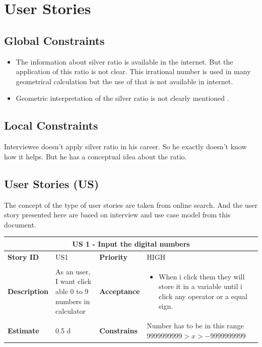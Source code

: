 \documentclass{article}
\begin{document}
\section{User Stories}
\subsection{Global Constraints}
\begin{itemize}
  \item The information about silver ratio is available in the internet. But the application of this ratio is not clear. This irrational number is used in many geometrical calculation but the use of that is not available in internet. 
  \item Geometric interpretation of the silver ratio is not clearly mentioned \cite{jdc_silver}.
\end{itemize}

\subsection{Local Constraints}
Interviewee doesn't apply silver ratio in his career. So he exactly doesn't know how it helps. But he has a conceptual idea about the ratio. 

\subsection{User Stories (US)}
The concept of the type of user stories are taken from online search\cite{js_story,cal_story}. And the user story presented here are based on interview and use case model from this document. \newline

\begin{tabular}{ |p{2cm}|p{5cm}|p{2cm}|p{4cm}| }
 \hline
 \multicolumn{4}{|c|}{US 1 - Input the digital numbers} \\
 \hline
 \textbf {Story ID}& US1 &  \textbf{Priority} & HIGH \\
 \hline
  \textbf{Description}   & As an user, I want click able 0 to 9 numbers in calculator &    \textbf{Acceptance}& 
\begin{itemize}
\item When i click them they will store it in a variable until i click any operator or a equal sign.
\end{itemize}
  \\
 \hline
 \textbf{Estimate} & 0.5 d &  \textbf{Constrains}& Number has to be in this range $9999999999>x>-9999999999$  \\
 \hline
\end{tabular}
\end{document}
